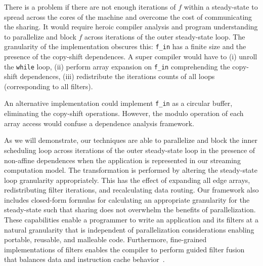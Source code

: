 There is a problem if there are not enough iterations of $f$ within a
steady-state to spread across the cores of the machine and overcome
the cost of communicating the sharing. It would require heroic
compiler analysis and program understanding to parallelize and block
$f$ across iterations of the outer steady-state loop.  The granularity
of the implementation obscures this: {\tt f\_in} has a finite size and
the presence of the copy-shift dependences.  A super compiler would
have to (i) unroll the {\tt while} loop, (ii) perform array expansion
on {\tt f\_in} comprehending the copy-shift dependences, (iii)
redistribute the iterations counts of all loops (corresponding to all
filters).

An alternative implementation could implement {\tt f\_in} as a
circular buffer, eliminating the copy-shift operations. However, the
modulo operation of each array access would confuse a dependence
analysis framework.

As we will demonstrate, our techniques are able to parallelize and
block the inner scheduling loop across iterations of the outer
steady-state loop in the presence of non-affine dependences when the
application is represented in our streaming computation model.  The
transformation is performed by altering the steady-state loop
granularity appropriately.  This has the effect of expanding all edge
arrays, redistributing filter iterations, and recalculating data
routing.  Our framework also includes closed-form formulas for
calculating an appropriate granularity for the steady-state such that
sharing does not overwhelm the benefits of parallelization.
These capabilities enable a programmer to write an application
and its filters at a natural granularity that is independent of
parallelization considerations enabling portable, reusable, and
malleable code.  Furthermore, fine-grained implementations of filters
enables the compiler to perform guided filter fusion that balances
data and instruction cache behavior~\cite{sermulins-lctes05}.  
